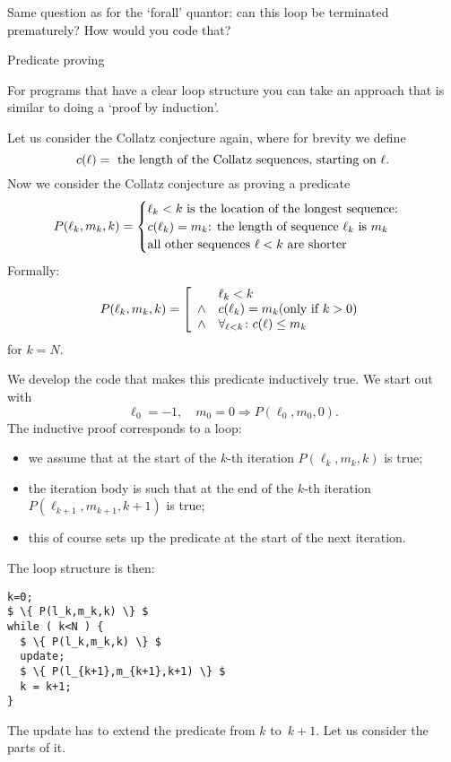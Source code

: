 \begin{exercise}
  Same question as for the `forall' quantor:
  can this loop be terminated prematurely?
  How would you code that?
\end{exercise}

 {Predicate proving}

For programs that have a clear loop structure you can take
an approach that is similar to doing a `proof by induction'.

Let us consider the Collatz conjecture again,
where for brevity we define
\[ c(\ell)=\hbox{ the length of the Collatz sequences, starting on $\ell$}. \]
Now we consider the Collatz conjecture as proving a predicate
\[ P(\ell_k,m_k,k) =
\begin{cases}
  \hbox{$\ell_k<k$ is the location of the longest sequence:}\\
  \hbox{$c(\ell_k)=m_k$: the length of sequence $\ell_k$ is $m_k$}\\
  \hbox{all other sequences $\ell<k$ are shorter}\\  
\end{cases}
\]
Formally:
\[ P(\ell_k,m_k,k) =
\left[
\begin{array}{cl}
  &\ell_k<k\\
  \wedge & c(\ell_k)=m_k \hbox{(only if $k>0$)} \\
  \wedge & \forall_{\ell<k}\colon c(\ell)\leq m_k\\
\end{array} \right.
\]
for $k=N$.

We develop the code that makes this predicate inductively true.
We start out with
\[ \ell_0=-1, \quad m_0=0 \Rightarrow P(\ell_0,m_0,0). \]
The inductive proof corresponds to a loop:
\begin{itemize}
\item we assume that at the start of the $k$-th iteration
  $P(\ell_k,m_k,k)$ is true;
\item the iteration body is such that at the end of the $k$-th iteration
  $P(\ell_{k+1},m_{k+1},k+1)$ is true;
\item this of course sets up the predicate at the start of the next iteration.
\end{itemize}

The loop structure is then:
\begin{lstlisting}[mathescape=true]
k=0;
$ \{ P(l_k,m_k,k) \} $
while ( k<N ) {
  $ \{ P(l_k,m_k,k) \} $
  update;
  $ \{ P(l_{k+1},m_{k+1},k+1) \} $
  k = k+1;
}
\end{lstlisting}
The update has to extend the predicate from $k$ to~$k+1$.
Let us consider the parts of it.

